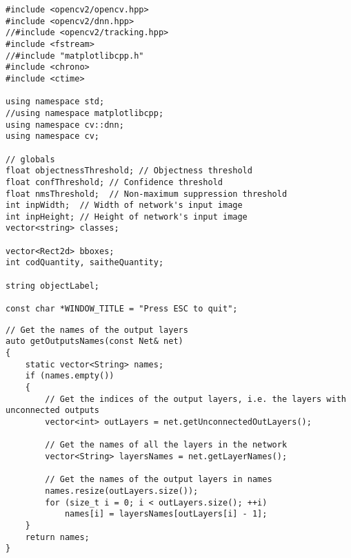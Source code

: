 \label{lst:header}
\begin{verbatim}
#include <opencv2/opencv.hpp>
#include <opencv2/dnn.hpp>
//#include <opencv2/tracking.hpp>
#include <fstream>
//#include "matplotlibcpp.h"
#include <chrono>
#include <ctime>

using namespace std;
//using namespace matplotlibcpp;
using namespace cv::dnn;
using namespace cv;

// globals
float objectnessThreshold; // Objectness threshold
float confThreshold; // Confidence threshold
float nmsThreshold;  // Non-maximum suppression threshold
int inpWidth;  // Width of network's input image
int inpHeight; // Height of network's input image
vector<string> classes;

vector<Rect2d> bboxes;
int codQuantity, saitheQuantity;

string objectLabel;

const char *WINDOW_TITLE = "Press ESC to quit";
\end{verbatim}

\begin{verbatim}
// Get the names of the output layers
auto getOutputsNames(const Net& net)
{
    static vector<String> names;
    if (names.empty())
    {
        // Get the indices of the output layers, i.e. the layers with unconnected outputs
        vector<int> outLayers = net.getUnconnectedOutLayers();

        // Get the names of all the layers in the network
        vector<String> layersNames = net.getLayerNames();

        // Get the names of the output layers in names
        names.resize(outLayers.size());
        for (size_t i = 0; i < outLayers.size(); ++i)
            names[i] = layersNames[outLayers[i] - 1];
    }
    return names;
}
\end{verbatim}

